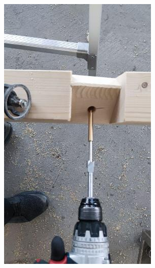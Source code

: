 \documentclass[11pt]{book}
\begin{document}
\begin{figure}[H]
\centering
\begin{subfigure}[b]{0.45\textwidth}
\centering
\includegraphics[width=\textwidth]{./images/image90.jpeg}
\end{subfigure}
\hfill
\begin{subfigure}[b]{0.45\textwidth}
\centering

\end{subfigure}
\end{figure}
\end{document}
